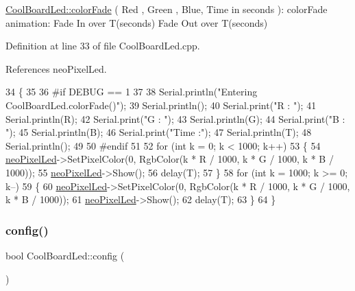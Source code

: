 \hyperlink{classCoolBoardLed_a6dbfe23988f43e1242cd05e69b13ff30}{Cool\+Board\+Led\+::color\+Fade} ( Red , Green , Blue, Time in seconds )\+: color\+Fade animation\+: Fade In over T(seconds) Fade Out over T(seconds) 

Definition at line 33 of file Cool\+Board\+Led.\+cpp.



References neo\+Pixel\+Led.


\begin{DoxyCode}
34 \{
35 
36 \textcolor{preprocessor}{#if DEBUG == 1}
37 
38     Serial.println(\textcolor{stringliteral}{"Entering CoolBoardLed.colorFade()"});
39     Serial.println();
40     Serial.print(\textcolor{stringliteral}{"R : "});
41     Serial.println(R);
42     Serial.print(\textcolor{stringliteral}{"G : "});
43     Serial.println(G);
44     Serial.print(\textcolor{stringliteral}{"B : "});
45     Serial.println(B);
46     Serial.print(\textcolor{stringliteral}{"Time :"});
47     Serial.println(T);
48     Serial.println();
49 
50 \textcolor{preprocessor}{#endif  }
51 
52     \textcolor{keywordflow}{for} (\textcolor{keywordtype}{int} k = 0; k < 1000; k++) 
53     \{
54         \hyperlink{classCoolBoardLed_ac2c13fa462a010cd9242bf297c013923}{neoPixelLed}->SetPixelColor(0, RgbColor(k * R / 1000, k * G / 1000, k * B / 1000));
55         \hyperlink{classCoolBoardLed_ac2c13fa462a010cd9242bf297c013923}{neoPixelLed}->Show();
56         delay(T);
57     \}
58     \textcolor{keywordflow}{for} (\textcolor{keywordtype}{int} k = 1000; k >= 0; k--) 
59     \{
60         \hyperlink{classCoolBoardLed_ac2c13fa462a010cd9242bf297c013923}{neoPixelLed}->SetPixelColor(0, RgbColor(k * R / 1000, k * G / 1000, k * B / 1000));
61         \hyperlink{classCoolBoardLed_ac2c13fa462a010cd9242bf297c013923}{neoPixelLed}->Show();
62         delay(T);
63     \}
64 \}
\end{DoxyCode}
\mbox{\label{classCoolBoardLed_a1b60e5e30bea96c49ed62ed1bf1ffc8b}} 
\subsubsection{\texorpdfstring{config()}{config()}}
{\footnotesize\ttfamily bool Cool\+Board\+Led\+::config (\begin{DoxyParamCaption}{ }\end{DoxyParamCaption})}

